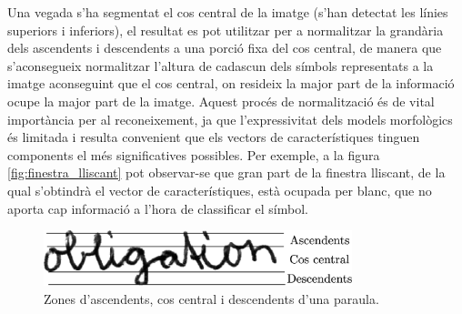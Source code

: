 Una vegada s'ha segmentat el cos central de la imatge (s'han detectat les línies superiors i inferiors), el resultat es pot utilitzar per a normalitzar la grandària dels ascendents i descendents a una porció fixa del cos central, de manera que s'aconsegueix normalitzar l'altura de cadascun dels símbols representats a la imatge aconseguint que el cos central, on resideix la major part de la informació ocupe la major part de la imatge. Aquest procés de normalització és de vital importància per al reconeixement, ja que l'expressivitat dels models morfològics és limitada i resulta convenient que els vectors de característiques tinguen components el més significatives possibles. Per exemple, a la figura \ref{fig:finestra_lliscant} pot observar-se que gran part de la finestra lliscant, de la qual s'obtindrà el vector de característiques, està ocupada per blanc, que no aporta cap informació a l'hora de classificar el símbol.\\

\begin{figure}
\centering
\includegraphics[width=0.8\textwidth]{images/ascendents_descendents_central.eps}
\caption{Zones d'ascendents, cos central i descendents d'una paraula. \cite{Pastor07}}\label{fig:ascendents_descendents_central}
\end{figure}

